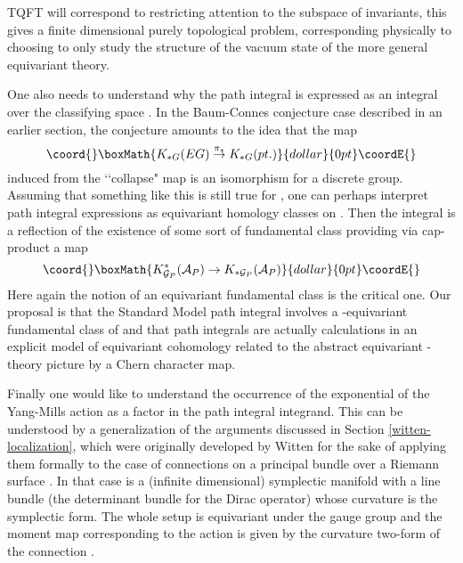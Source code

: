 \documentclass[a4paper,a4paper]{article}
\theoremstyle{conjecture}
\begin{document}
TQFT will correspond to restricting attention to the subspace of \coordHE{} invariants,
this gives a finite dimensional purely topological problem, corresponding physically
to choosing to only study the structure of the vacuum state of the more general
equivariant theory.

One also needs to understand why the path integral is expressed as an integral over the classifying
space \coordHE{}.  In the Baum-Connes conjecture case described
in an earlier section, the conjecture amounts to the idea that the map
$$\coord{}\boxMath{K_{*G}(EG)\stackrel{\pi_*}\rightarrow K_{*G}(pt.)}{dollar}{0pt}\coordE{}$$
induced from the \lq\lq collapse" map \coordHE{} is an isomorphism for \coordHE{} a discrete group.
Assuming that something like this is still true for \coordHE{}, one
can perhaps interpret path integral expressions as equivariant homology classes on \coordHE{}.  Then
the integral is a reflection of the existence of some sort of fundamental class providing via cap-product
a map
$$\coord{}\boxMath{K^*_{{\mathcal G}_P}({\mathcal A}_P)\rightarrow K_{*{\mathcal G}_P}({\mathcal A}_P)}{dollar}{0pt}\coordE{}$$
Here again the notion of an equivariant fundamental class is the critical one. Our proposal is that the
Standard Model path integral involves a \coordHE{}-equivariant fundamental class of
\coordHE{} and that path integrals are actually calculations in an explicit model of
equivariant cohomology related to the abstract equivariant \coordHE{}-theory picture by a Chern character map.

Finally one would like to understand the occurrence of the
exponential of the Yang-Mills action as a factor in the path
integral integrand.  This can be understood by
a generalization of the arguments discussed in Section
\ref{witten-localization}, which were
originally developed by Witten for the sake of applying them
formally to the case of connections on a principal bundle \coordHE{} over
a Riemann surface \myHighlight{$\Sigma$}\coordHE{}.  In that case \coordHE{} is a
(infinite dimensional) symplectic manifold with a line bundle \coordHE{}
(the determinant bundle for the Dirac operator) whose curvature is
the symplectic form. The whole setup is equivariant under the
gauge group \coordHE{} and the moment map corresponding to
the \coordHE{} action is given by the curvature two-form
\coordHE{} of the connection \coordHE{}.  
\end{document}
